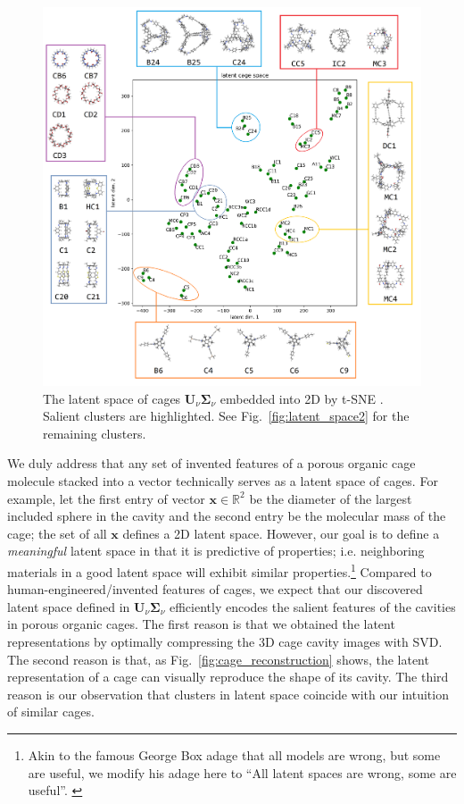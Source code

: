 \documentclass[journal=jacsat,manuscript=article,layout=traditional]{achemso}
\begin{document}
\begin{figure}
\centering
	\includegraphics[width=\columnwidth]{../latent_cage_space_2D_marked_main.png}
	\caption{The latent space of cages $\mathbf{U}_\nu \mathbf{\Sigma}_\nu$ embedded into 2D by t-SNE \cite{maaten2008visualizing,wattenberg2016how}. Salient clusters are highlighted. See Fig.~\ref{fig:latent_space2} for the remaining clusters.
	} \label{fig:latent_space}
\end{figure}

We duly address that any set of invented features of a porous organic cage molecule stacked into a vector technically serves as a latent space of cages. For example, let the first entry of vector $\mathbf{x}\in \mathbb{R}^2$ be the diameter of the largest included sphere in the cavity and the second entry be the molecular mass of the cage; the set of all $\mathbf{x}$ defines a 2D latent space. However, our goal is to define a \emph{meaningful} latent space in that it is predictive of properties; i.e. neighboring materials in a good latent space will exhibit similar properties.\footnote[3]{Akin to the famous George Box adage that all models are wrong, but some are useful, we modify his adage here to ``All latent spaces are wrong, some are useful''. \cite{box1976science}} Compared to human-engineered/invented features of cages, we expect that our discovered latent space defined in $\mathbf{U}_\nu \mathbf{\Sigma}_\nu$ efficiently encodes the salient features of the cavities in porous organic cages. The first reason is that we obtained the latent representations by optimally compressing the 3D cage cavity images with SVD. The second reason is that, as Fig.~\ref{fig:cage_reconstruction} shows, the latent representation of a cage can visually reproduce the shape of its cavity. The third reason is our observation that clusters in latent space coincide with our intuition of similar cages.
\end{document}
